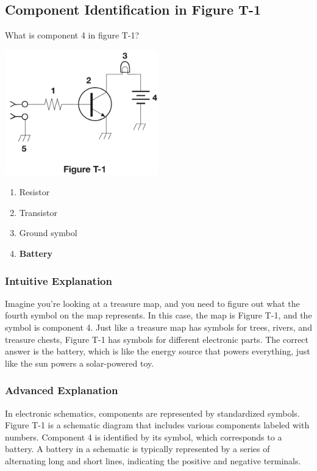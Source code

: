\subsection{Component Identification in Figure T-1}
\label{T6C05}

\begin{tcolorbox}[colback=gray!10!white,colframe=black!75!black,title=T6C05]
What is component 4 in figure T-1?

\includegraphics[width=0.5\textwidth]{tech/images/t1.png} 



\begin{enumerate}[label=\Alph*)]
    \item Resistor
    \item Transistor
    \item Ground symbol
    \item \textbf{Battery}
\end{enumerate}
\end{tcolorbox}

\subsubsection{Intuitive Explanation}
Imagine you're looking at a treasure map, and you need to figure out what the fourth symbol on the map represents. In this case, the map is Figure T-1, and the symbol is component 4. Just like a treasure map has symbols for trees, rivers, and treasure chests, Figure T-1 has symbols for different electronic parts. The correct answer is the battery, which is like the energy source that powers everything, just like the sun powers a solar-powered toy.

\subsubsection{Advanced Explanation}
In electronic schematics, components are represented by standardized symbols. Figure T-1 is a schematic diagram that includes various components labeled with numbers. Component 4 is identified by its symbol, which corresponds to a battery. A battery in a schematic is typically represented by a series of alternating long and short lines, indicating the positive and negative terminals. 

